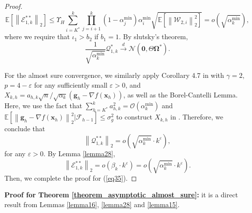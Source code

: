\documentclass[aos]{imsart}
\numberwithin{equation}{section}
\theoremstyle{plain}
\begin{document}
\begin{appendix}
\begin{proof}
    \begin{equation*}
        \mathbb{E} \left[ \left\| \mathcal{E}_{1,k}^{**} \right\|_2 \right] \leq \Upsilon_{H} \sum_{i=K^{*}}^{k} \prod_{j=i+1}^{k} (1-\alpha^{\min}_j) \alpha^{\min}_i  \sqrt{   \mathbb{E} \left[ \left\| \mathcal{W}_{2,i} \right\|_2^2 \right]} = o\left( \sqrt{\alpha^{\min}_k} \right),
    \end{equation*}
    where we require that $\iota_1 >b_2$ if $b_1 = 1$. By slutsky's theorem, 
    \begin{equation*}
        \frac{1}{\sqrt{\alpha^{\min}_k}} \mathcal{Q}_{1,k}^{*}  \stackrel{d}{\longrightarrow} \mathcal{N} \left( \bm{0}, \Theta \bm{\Omega}^{*} \right).
    \end{equation*}


    For the almost sure convergence, we similarly apply Corollary 4.7 in \cite{hao2014convergence} with $\gamma = 2$, $p = 4-\varepsilon$ for any sufficiently small $\varepsilon > 0$, and $X_{k,h} = a_{h,k} \sqrt{n} / \sqrt{\alpha_k} \left( \bm{g}_h - \nabla f(\bm{x}_{h}) \right)$, as well as the Borel-Cantelli Lemma. Here, we use the fact that $\sum_{h=K^{*}}^{k} a_{h,k}^2 = \mathcal{O}\left( \alpha^{\min}_k \right)$ and $\mathbb{E} \left[ \left\| \bm{g}_h - \nabla f(\bm{x}_{h})  \right\|_2^2 | \mathcal{F}_{h-1}  \right] \leq \sigma_{g}^2$ to construct $X_{k,h}$ in \cite{hao2014convergence}. Therefore, we conclude that 
    \begin{equation*}
        \left\| \mathcal{Q}_{1,k}^{**} \right\|_2 = o\left( \sqrt{\alpha^{\min}_k} \cdot k^{\varepsilon}  \right),
    \end{equation*}
    for any $\varepsilon > 0$. By Lemma \ref{lemma28}, 
    \begin{equation*}
        \left\| \mathcal{E}_{1,k}^{**} \right\|_2 = o\left( \beta_k \cdot k^{\varepsilon} \right) = o\left( \sqrt{\alpha^{\min}_k} \cdot k^{\varepsilon} \right).
    \end{equation*}
    Then, we complete the proof for (\ref{eq35}).
    
    
    \end{proof}


\textbf{Proof for Theorem \ref{theorem_asymptotic_almost_sure}:}  it is a direct result from Lemmas \ref{lemma16}, \ref{lemma28} and \ref{lemma15}.


\end{appendix}
\end{document}
